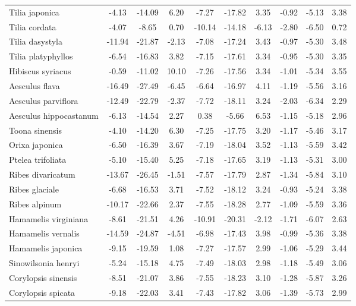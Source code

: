 \documentclass[11pt]{article}
\begin{document}
\begin{longtable}{p{1.50in}c{0.32in}c{0.32in}c{0.32in}c{0.32in}c{0.32in}c{0.32in}c{0.2in}c{0.3in}c{0.1in}}
  Tilia japonica & -4.13 & -14.09 & 6.20 & -7.27 & -17.82 & 3.35 & -0.92 & -5.13 & 3.38 \\ 
  Tilia cordata & -4.07 & -8.65 & 0.70 & -10.14 & -14.18 & -6.13 & -2.80 & -6.50 & 0.72 \\ 
  Tilia dasystyla & -11.94 & -21.87 & -2.13 & -7.08 & -17.24 & 3.43 & -0.97 & -5.30 & 3.48 \\ 
  Tilia platyphyllos & -6.54 & -16.83 & 3.82 & -7.15 & -17.61 & 3.34 & -0.95 & -5.30 & 3.35 \\ 
  Hibiscus syriacus & -0.59 & -11.02 & 10.10 & -7.26 & -17.56 & 3.34 & -1.01 & -5.34 & 3.55 \\ 
  Aesculus flava & -16.49 & -27.49 & -6.45 & -6.64 & -16.97 & 4.11 & -1.19 & -5.56 & 3.16 \\ 
  Aesculus parviflora & -12.49 & -22.79 & -2.37 & -7.72 & -18.11 & 3.24 & -2.03 & -6.34 & 2.29 \\ 
  Aesculus hippocastanum & -6.13 & -14.54 & 2.27 & 0.38 & -5.66 & 6.53 & -1.15 & -5.18 & 2.96 \\ 
  Toona sinensis & -4.10 & -14.20 & 6.30 & -7.25 & -17.75 & 3.20 & -1.17 & -5.46 & 3.17 \\ 
  Orixa japonica & -6.50 & -16.39 & 3.67 & -7.19 & -18.04 & 3.52 & -1.13 & -5.59 & 3.42 \\ 
  Ptelea trifoliata & -5.10 & -15.40 & 5.25 & -7.18 & -17.65 & 3.19 & -1.13 & -5.31 & 3.00 \\ 
  Ribes divaricatum & -13.67 & -26.45 & -1.51 & -7.57 & -17.79 & 2.87 & -1.34 & -5.84 & 3.10 \\ 
  Ribes glaciale & -6.68 & -16.53 & 3.71 & -7.52 & -18.12 & 3.24 & -0.93 & -5.24 & 3.38 \\ 
  Ribes alpinum & -10.17 & -22.66 & 2.37 & -7.55 & -18.28 & 2.77 & -1.09 & -5.59 & 3.36 \\ 
  Hamamelis virginiana & -8.61 & -21.51 & 4.26 & -10.91 & -20.31 & -2.12 & -1.71 & -6.07 & 2.63 \\ 
  Hamamelis vernalis & -14.59 & -24.87 & -4.51 & -6.98 & -17.43 & 3.98 & -0.99 & -5.36 & 3.38 \\ 
  Hamamelis japonica & -9.15 & -19.59 & 1.08 & -7.27 & -17.57 & 2.99 & -1.06 & -5.29 & 3.44 \\ 
  Sinowilsonia henryi & -5.24 & -15.18 & 4.75 & -7.49 & -18.03 & 2.98 & -1.18 & -5.49 & 3.06 \\ 
  Corylopsis sinensis & -8.51 & -21.07 & 3.86 & -7.55 & -18.23 & 3.10 & -1.28 & -5.87 & 3.26 \\ 
  Corylopsis spicata & -9.18 & -22.03 & 3.41 & -7.43 & -17.82 & 3.06 & -1.39 & -5.73 & 2.99 \\ 

\end{longtable}
\end{document}
